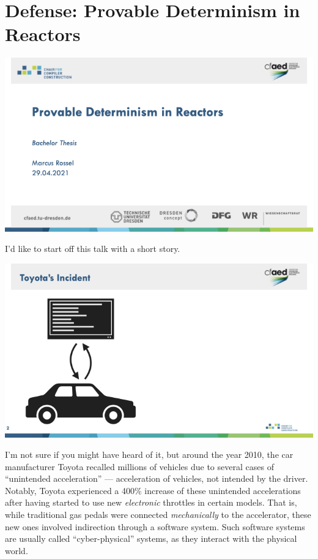 \documentclass{article}
\begin{document}
\section*{Defense: Provable Determinism in Reactors}

\begin{center}
    \includegraphics[width=\columnwidth]{Slides/Slide 1.jpeg}
\end{center}

I'd like to start off this talk with a short story.

\begin{center}
    \includegraphics[width=\columnwidth]{Slides/Slide 2.jpeg}
\end{center}

I'm not sure if you might have heard of it, but around the year 2010, the car manufacturer Toyota recalled millions of vehicles due to several cases of ``unintended acceleration'' --- acceleration of vehicles, not intended by the driver.
Notably, Toyota experienced a 400\% increase of these unintended accelerations after having started to use new \emph{electronic} throttles in certain models.
That is, while traditional gas pedals were connected \emph{mechanically} to the accelerator, these new ones involved indirection through a software system.
Such software systems are usually called ``cyber-physical'' systems, as they interact with the physical world.
\end{document}
